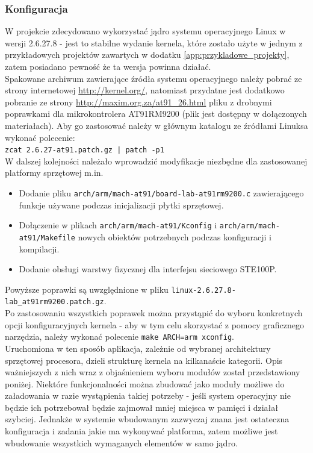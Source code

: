 \documentclass[a4paper,12pt]{book}
\begin{document}
				\subsubsection{Konfiguracja}
					W projekcie zdecydowano wykorzystać jądro systemu operacyjnego Linux w wersji 2.6.27.8 - jest to stabilne wydanie kernela, które zostało użyte w jednym z przykładowych projektów zawartych w dodatku \ref{app:przykladowe_projekty}, zatem posiadano pewność że ta wersja powinna działać.\\
					Spakowane archiwum zawierające źródła systemu operacyjnego należy pobrać ze strony internetowej \url{http://kernel.org/}, natomiast przydatne jest dodatkowo pobranie ze strony \url{http://maxim.org.za/at91_26.html} pliku z drobnymi poprawkami dla mikrokontrolera AT91RM9200 (plik jest dostępny w dołączonych materiałach). Aby go zastosować należy w głównym katalogu ze źródłami Linuksa wykonać polecenie:\\
					\texttt{zcat 2.6.27-at91.patch.gz | patch -p1}\\
					W dalszej kolejności należało wprowadzić modyfikacje niezbędne dla zastosowanej platformy sprzętowej m.in.
					\begin{itemize}
						\item Dodanie pliku \texttt{arch/arm/mach-at91/board-lab-at91rm9200.c} zawierającego funkcje używane podczas inicjalizacji płytki sprzętowej.
						\item Dołączenie w plikach \texttt{arch/arm/mach-at91/Kconfig} i \texttt{arch/arm/mach-at91/Makefile} nowych obiektów potrzebnych podczas konfiguracji i kompilacji.
						\item Dodanie obsługi warstwy fizycznej dla interfejsu sieciowego STE100P.
					\end{itemize}
					Powyższe poprawki są uwzględnione w pliku \texttt{linux-2.6.27.8-lab\_at91rm9200.patch.gz}.\\
					Po zastosowaniu wszystkich poprawek można przystąpić do wyboru konkretnych opcji konfiguracyjnych kernela - aby w tym celu skorzystać z pomocy graficznego narzędzia, należy wykonać polecenie \texttt{make ARCH=arm xconfig}.\\
					Uruchomiona w ten sposób aplikacja, zależnie od wybranej architektury sprzętowej procesora, dzieli strukturę kernela na kilkanaście kategorii. Opis ważniejszych z nich wraz z objaśnieniem wyboru modułów został przedstawiony poniżej. Niektóre funkcjonalności można zbudować jako moduły możliwe do załadowania w razie wystąpienia takiej potrzeby - jeśli system operacyjny nie będzie ich potrzebował będzie zajmował mniej miejsca w pamięci i działał szybciej. Jednakże w systemie wbudowanym zazwyczaj znana jest ostateczna konfiguracja i zadania jakie ma wykonywać platforma, zatem możliwe jest wbudowanie wszystkich wymaganych elementów w samo jądro.
\end{document}
